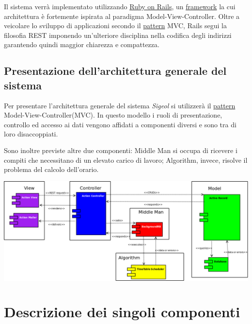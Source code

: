 \documentclass[11pt,a4paper]{article}
\begin{document}
Il sistema verrà implementato utilizzando \underline{Ruby on Rails}, un \underline{framework} la cui architettura è fortemente ispirata al paradigma Model-View-Controller. 
Oltre a veicolare lo sviluppo di applicazioni secondo il \underline{pattern} MVC, Rails segui la filosofia REST imponendo un’ulteriore disciplina nella codifica degli indirizzi garantendo quindi maggior chiarezza e compattezza.


\subsection{Presentazione dell'architettura generale del sistema}
Per presentare l'architettura generale del sistema \textit{Sigeol} si utilizzerà il \underline{pattern} Model-View-Controller(MVC).
In questo modello i ruoli di presentazione, controllo ed accesso ai dati vengono affidati a componenti diversi e sono tra di loro disaccoppiati.

Sono inoltre previste altre due componenti: Middle Man si occupa di ricevere i compiti che necessitano di un elevato carico di lavoro; Algorithm, invece, risolve il problema del calcolo dell'orario.

\begin{center}
\includegraphics[scale=0.3]{images/component_diagram.png}
\end{center}

\section{Descrizione dei singoli componenti}
\end{document}
